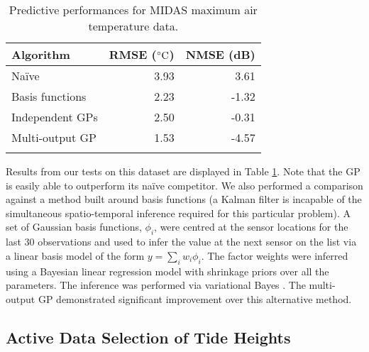 \documentclass{acmtrans2m}
\begin{document}
\begin{table}
\centering
\caption{Predictive performances for MIDAS maximum air temperature data.}
\label{tbl:MIDAS_RMSEs}
 \begin{tabular}{@{}lrr@{}}
\\
\toprule
Algorithm & RMSE ($^\circ\text{C}$) & NMSE (dB)\\
\midrule
Na\"{i}ve & 3.93 & 3.61\\
Basis functions & 2.23 & -1.32 \\
Independent GPs & 2.50 & -0.31 \\
Multi-output GP & 1.53 & -4.57 \\
\bottomrule
& \\
\end{tabular}
\end{table}

Results from our tests on this dataset are displayed in Table \ref{tbl:MIDAS_RMSEs}. Note that the GP is easily able to outperform its na\"{i}ve competitor. We also performed a comparison against a method built around basis functions (a Kalman filter is incapable of the simultaneous spatio-temporal inference required for this particular problem). A set of Gaussian basis functions, $\phi_i$, were centred at the sensor locations for the last 30 observations and used to infer the value at the next sensor on the list via a linear basis model of the form $y = \sum_i w_i \phi_i$. The factor weights were inferred using a Bayesian linear regression model with shrinkage priors over all the parameters. The inference was performed via variational Bayes \cite{Bishop}. The multi-output GP demonstrated significant improvement over this alternative method. 


\subsection{Active Data Selection of Tide Heights}
\end{document}
